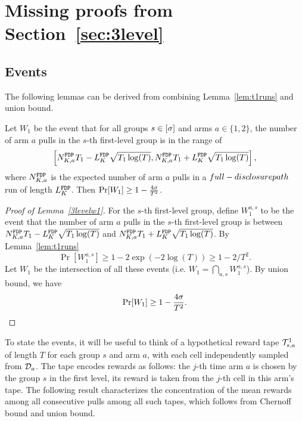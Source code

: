 
\section{Missing proofs from Section~\ref{sec:3level}}
\label{sec:3level-pfs}





\subsection{Events}

The following lemmas can be derived from combining Lemma~\ref{lem:t1runs} and union bound.

\begin{lemma}\label{3levelw1}
  Let $W_1$ be the event that for all groups $s\in [\sigma]$ and arms
  $a\in \{1, 2\}$, the number of arm $a$ pulls in the $s$-th
  first-level group is in the range of
  $$
  \left[N^\mathtt{FDP}_{K,a}  T_1- L^\mathtt{FDP}_K \sqrt{T_1\log(T)}, N^\mathtt{FDP}_{K,a}  T_1 + L^\mathtt{FDP}_K \sqrt{T_1\log(T)}\right],
  $$
  where $N^\mathtt{FDP}_{K,a} $ is the expected number of arm $a$ pulls in a $full-disclosure path$ run
  of length $L^\mathtt{FDP}_K$. Then $\Pr[W_1] \geq 1- \frac{4\sigma}{T^2}$.
\end{lemma}

\begin{proof}[Proof of Lemma~\ref{3levelw1}]
  For the $s$-th first-level group, define $W_1^{a,s}$ to be the event
  that the number of arm $a$ pulls in the $s$-th first-level group is
  between $N^\mathtt{FDP}_{K,a} T_1- L^\mathtt{FDP}_K \sqrt{T_1\log(T)}$ and
  $N^\mathtt{FDP}_{K,a} T_1 + L^\mathtt{FDP}_K \sqrt{T_1\log(T)}$. By Lemma~\ref{lem:t1runs}
\[
\Pr[W_1^{a,s}] \geq 1-2\exp(-2\log(T)) \geq 1-2/T^2.
\]
Let $W_1$  be the intersection of all these events (i.e.
$W_1 = \bigcap_{a,s}W_1^{a,s}$). By union bound, we have
\[
\Pr[W_1] \geq 1- \frac{4\sigma}{T^2}.
\]
\end{proof}

To state the events, it will be useful to think of a
hypothetical reward tape $\mathcal{T}^1_{s, a}$ of length $T$ for each
group $s$ and arm $a$, with each cell independently sampled from
$\mathcal{D}_a$.  The tape encodes rewards as follows: the $j$-th time arm $a$
is chosen by the group $s$ in the first level, its reward is taken
from the $j$-th cell in this arm's tape. The following result
characterizes the concentration of the mean rewards among all
consecutive pulls among all such tapes, which follows from Chernoff
bound and union bound.

